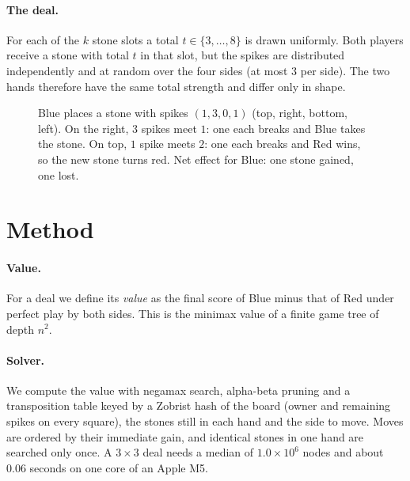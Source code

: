 \documentclass[11pt,a4paper]{article}
\newcommand{\spikes}[3]{%
  \ifcase#1\or
    \fill[#2] (-0.09,0.5) -- (0,0.66) -- (0.09,0.5) -- cycle;\or
    \fill[#2] (-0.24,0.5) -- (-0.15,0.66) -- (-0.06,0.5) -- cycle; \fill[#2] (0.06,0.5) -- (0.15,0.66) -- (0.24,0.5) -- cycle;\or
    \fill[#2] (-0.33,0.5) -- (-0.24,0.66) -- (-0.15,0.5) -- cycle; \fill[#2] (-0.09,0.5) -- (0,0.66) -- (0.09,0.5) -- cycle; \fill[#2] (0.15,0.5) -- (0.24,0.66) -- (0.33,0.5) -- cycle;\fi}
\newcommand{\stone}[8]{\begin{scope}[shift={(#1,#2)}, scale=0.74]
  \filldraw[fill=#8, draw=#7, thick, rounded corners=1.5pt] (-0.5,-0.5) rectangle (0.5,0.5);
  \begin{scope}[rotate=0]\spikes{#3}{#7}{}\end{scope}
  \begin{scope}[rotate=-90]\spikes{#4}{#7}{}\end{scope}
  \begin{scope}[rotate=180]\spikes{#5}{#7}{}\end{scope}
  \begin{scope}[rotate=90]\spikes{#6}{#7}{}\end{scope}
\end{scope}}
\begin{document}
\paragraph{The deal.} For each of the $k$ stone slots a total $t \in \{3,\dots,8\}$ is drawn uniformly. Both players receive a stone with total $t$ in that slot, but the spikes are distributed independently and at random over the four sides (at most $3$ per side). The two hands therefore have the same total strength and differ only in shape.

\begin{figure}[ht]
\centering
{}
\caption{Blue places a stone with spikes $(1,3,0,1)$ (top, right, bottom, left). On the right, $3$ spikes meet $1$: one each breaks and Blue takes the stone. On top, $1$ spike meets $2$: one each breaks and Red wins, so the new stone turns red. Net effect for Blue: one stone gained, one lost.}
\label{fig:clash}
\end{figure}

\section{Method}

\paragraph{Value.} For a deal we define its \emph{value} as the final score of Blue minus that of Red under perfect play by both sides. This is the minimax value of a finite game tree of depth $n^2$.

\paragraph{Solver.} We compute the value with negamax search, alpha-beta pruning and a transposition table keyed by a Zobrist hash of the board (owner and remaining spikes on every square), the stones still in each hand and the side to move. Moves are ordered by their immediate gain, and identical stones in one hand are searched only once. A $3\times3$ deal needs a median of $1.0\times10^{6}$ nodes and about $0.06$ seconds on one core of an Apple M5.
\end{document}
